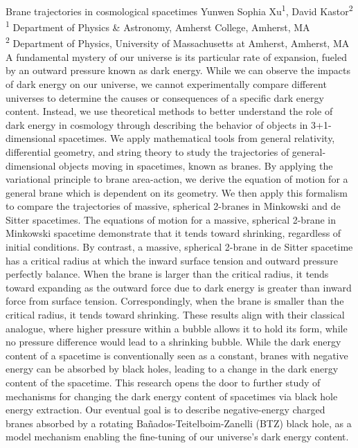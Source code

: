 \makeabstract
    {
    Brane trajectories in cosmological spacetimes
    }
    {
    Yunwen Sophia Xu\textsuperscript{1}, David Kastor\textsuperscript{2}
    }
    {
    \textsuperscript{1} Department of Physics \& Astronomy, Amherst College, Amherst, MA\\
\textsuperscript{2} Department of Physics, University of Massachusetts at Amherst, Amherst, MA
    }
    {
    A fundamental mystery of our universe is its particular rate of expansion, fueled by an outward pressure known as dark energy. While we can observe the impacts of dark energy on our universe, we cannot experimentally compare different universes to determine the causes or consequences of a specific dark energy content. Instead, we use theoretical methods to better understand the role of dark energy in cosmology through describing the behavior of objects in 3+1-dimensional spacetimes.
    }
    {
    We apply mathematical tools from general relativity, differential geometry, and string theory to study the trajectories of general-dimensional objects moving in spacetimes, known as branes. By applying the variational principle to brane area-action, we derive the equation of motion for a general brane which is dependent on its geometry. We then apply this formalism to compare the trajectories of massive, spherical 2-branes in Minkowski and de Sitter spacetimes. 
    }
    {
    The equations of motion for a massive, spherical 2-brane in Minkowski spacetime demonstrate that it tends toward shrinking, regardless of initial conditions. By contrast, a massive, spherical 2-brane in de Sitter spacetime has a critical radius at which the inward surface tension and outward pressure perfectly balance. When the brane is larger than the critical radius, it tends toward expanding as the outward force due to dark energy is greater than inward force from surface tension. Correspondingly, when the brane is smaller than the critical radius, it tends toward shrinking. These results align with their classical analogue, where higher pressure within a bubble allows it to hold its form, while no pressure difference would lead to a shrinking bubble.
    }
    {
    While the dark energy content of a spacetime is conventionally seen as a constant, branes with negative energy can be absorbed by black holes, leading to a change in the dark energy content of the spacetime. This research opens the door to further study of mechanisms for changing the dark energy content of spacetimes via black hole energy extraction. Our eventual goal is to describe negative-energy charged branes absorbed by a rotating Ba\~nados-Teitelboim-Zanelli (BTZ) black hole, as a model mechanism enabling the fine-tuning of our universe's dark energy content.
    }

    \newpage
    